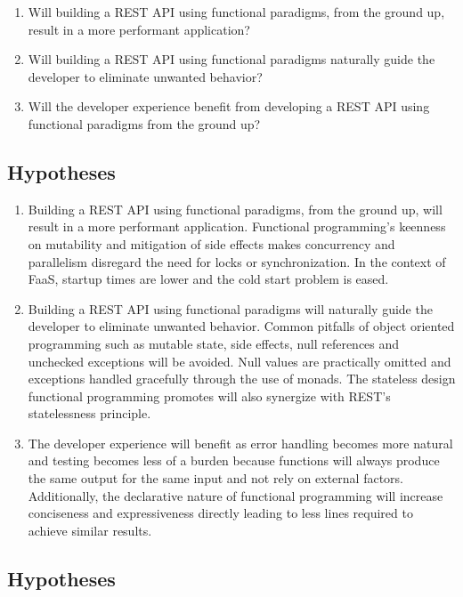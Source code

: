 \documentclass[a4paper]{article}
\begin{document}
\begin{enumerate}
	\item Will building a REST API using functional paradigms, from the
	      ground up, result in a more performant application?
	\item Will building a REST API using functional paradigms naturally
	      guide the developer to eliminate unwanted behavior?
	\item Will the developer experience benefit from developing a REST API using
	      functional paradigms from the ground up?
\end{enumerate}

\subsection{Hypotheses}

\begin{enumerate}
	\item Building a REST API using functional paradigms, from the ground
	      up, will result in a more performant application. Functional
	      programming's keenness on mutability and mitigation of side effects
	      makes concurrency and parallelism disregard the need for locks or
	      synchronization. In the context of FaaS, startup times are lower
	      and the cold start problem is eased.
	\item Building a REST API using functional paradigms will naturally guide
	      the developer to eliminate unwanted behavior. Common pitfalls of
	      object oriented programming such as mutable state, side effects,
	      null references and unchecked exceptions will be avoided. Null
	      values are practically omitted and exceptions handled gracefully
	      through the use of monads. The stateless design functional
	      programming promotes will also synergize with REST's statelessness
	      principle.
	\item The developer experience will benefit as error handling becomes more
	      natural and testing becomes less of a burden because functions will
	      always produce the same output for the same input and not rely on
	      external factors. Additionally, the declarative nature of functional
	      programming will increase conciseness and expressiveness directly
	      leading to less lines required to achieve similar results.
\end{enumerate}

\subsection{Hypotheses}
\end{document}
